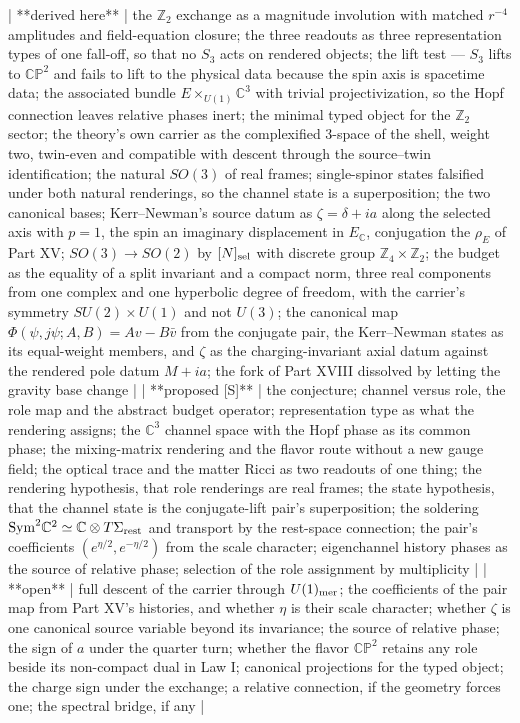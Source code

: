 | **derived here** | the $\mathbb Z_2$ exchange as a magnitude involution with matched $r^{-4}$ amplitudes and field-equation closure; the three readouts as three representation types of one fall-off, so that no $S_3$ acts on rendered objects; the lift test — $S_3$ lifts to $\mathbb{CP}^2$ and fails to lift to the physical data because the spin axis is spacetime data; the associated bundle $E\times_{U(1)}\mathbb C^3$ with trivial projectivization, so the Hopf connection leaves relative phases inert; the minimal typed object for the $\mathbb Z_2$ sector; the theory's own carrier as the complexified 3-space of the shell, weight two, twin-even and compatible with descent through the source–twin identification; the natural $SO(3)$ of real frames; single-spinor states falsified under both natural renderings, so the channel state is a superposition; the two canonical bases; Kerr–Newman's source datum as $\zeta = \delta+ia$ along the selected axis with $p = 1$, the spin an imaginary displacement in $E_{\mathbb C}$, conjugation the $\rho_E$ of Part XV; $SO(3)\to SO(2)$ by $[N]_{\rm sel}$ with discrete group $\mathbb Z_4\times\mathbb Z_2$; the budget as the equality of a split invariant and a compact norm, three real components from one complex and one hyperbolic degree of freedom, with the carrier's symmetry $SU(2)\times U(1)$ and not $U(3)$; the canonical map $\Phi(\psi,j\psi;A,B) = Av-B\bar v$ from the conjugate pair, the Kerr–Newman states as its equal-weight members, and $\zeta$ as the charging-invariant axial datum against the rendered pole datum $M+ia$; the fork of Part XVIII dissolved by letting the gravity base change |
| **proposed [S]** | the conjecture; channel versus role, the role map and the abstract budget operator; representation type as what the rendering assigns; the $\mathbb C^3$ channel space with the Hopf phase as its common phase; the mixing-matrix rendering and the flavor route without a new gauge field; the optical trace and the matter Ricci as two readouts of one thing; the rendering hypothesis, that role renderings are real frames; the state hypothesis, that the channel state is the conjugate-lift pair's superposition; the soldering ${\rm Sym}^2\mathbb C^2\simeq\mathbb C\otimes T\Sigma_{\rm rest}$ and transport by the rest-space connection; the pair's coefficients $(e^{\eta/2},e^{-\eta/2})$ from the scale character; eigenchannel history phases as the source of relative phase; selection of the role assignment by multiplicity |
| **open** | full descent of the carrier through $U(1)_{\rm mer}$; the coefficients of the pair map from Part XV's histories, and whether $\eta$ is their scale character; whether $\zeta$ is one canonical source variable beyond its invariance; the source of relative phase; the sign of $a$ under the quarter turn; whether the flavor $\mathbb{CP}^2$ retains any role beside its non-compact dual in Law I; canonical projections for the typed object; the charge sign under the exchange; a relative connection, if the geometry forces one; the spectral bridge, if any |

